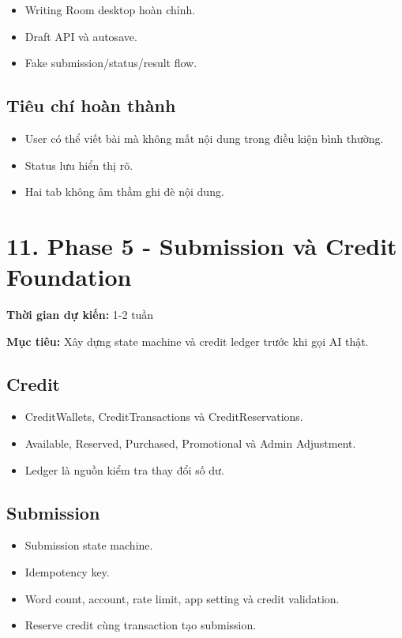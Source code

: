 \documentclass[
  11pt,
  a4paper,
]{article}
\begin{document}
\begin{itemize}
\item
  Writing Room desktop hoàn chỉnh.
\item
  Draft API và autosave.
\item
  Fake submission/status/result flow.
\end{itemize}

\subsection{Tiêu chí hoàn
thành}\label{tiuxeau-chuxed-houxe0n-thuxe0nh-4}

\begin{itemize}
\item
  User có thể viết bài mà không mất nội dung trong điều kiện bình
  thường.
\item
  Status lưu hiển thị rõ.
\item
  Hai tab không âm thầm ghi đè nội dung.
\end{itemize}

\section{11. Phase 5 - Submission và Credit
Foundation}\label{phase-5---submission-vuxe0-credit-foundation}

\textbf{Thời gian dự kiến:} 1-2 tuần

\textbf{Mục tiêu:} Xây dựng state machine và credit ledger trước khi gọi
AI thật.

\subsection{Credit}\label{credit}

\begin{itemize}
\item
  CreditWallets, CreditTransactions và CreditReservations.
\item
  Available, Reserved, Purchased, Promotional và Admin Adjustment.
\item
  Ledger là nguồn kiểm tra thay đổi số dư.
\end{itemize}

\subsection{Submission}\label{submission}

\begin{itemize}
\item
  Submission state machine.
\item
  Idempotency key.
\item
  Word count, account, rate limit, app setting và credit validation.
\item
  Reserve credit cùng transaction tạo submission.
\end{itemize}
\end{document}
